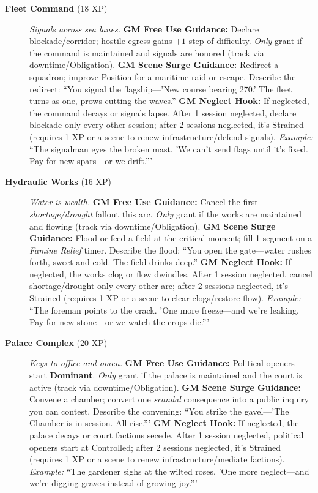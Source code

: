 \begin{description}
  \item[\textbf{Fleet Command} (18 XP)]   
        \emph{Signals across sea lanes.}  
        \textbf{GM Free Use Guidance:} Declare blockade/corridor; hostile egress gains $+1$ step of difficulty. \emph{Only} grant if the command is maintained and signals are honored (track via downtime/Obligation).  
        \textbf{GM Scene Surge Guidance:} Redirect a squadron; improve Position for a maritime raid or escape. Describe the redirect: ``You signal the flagship---'New course bearing 270.' The fleet turns as one, prows cutting the waves.''  
        \textbf{GM Neglect Hook:} If neglected, the command decays or signals lapse. After 1 session neglected, declare blockade only every other session; after 2 sessions neglected, it's Strained (requires 1 XP or a scene to renew infrastructure/defend signals).  
        \textit{Example:} ``The signalman eyes the broken mast. 'We can't send flags until it's fixed. Pay for new spars---or we drift.'''  

  \item[\textbf{Hydraulic Works} (16 XP)]   
        \emph{Water is wealth.}  
        \textbf{GM Free Use Guidance:} Cancel the first \emph{shortage/drought} fallout this arc. \emph{Only} grant if the works are maintained and flowing (track via downtime/Obligation).  
        \textbf{GM Scene Surge Guidance:} Flood or feed a field at the critical moment; fill 1 segment on a \emph{Famine Relief} timer. Describe the flood: ``You open the gate---water rushes forth, sweet and cold. The field drinks deep.''  
        \textbf{GM Neglect Hook:} If neglected, the works clog or flow dwindles. After 1 session neglected, cancel shortage/drought only every other arc; after 2 sessions neglected, it's Strained (requires 1 XP or a scene to clear clogs/restore flow).  
        \textit{Example:} ``The foreman points to the crack. 'One more freeze---and we're leaking. Pay for new stone---or we watch the crops die.'''  

  \item[\textbf{Palace Complex} (20 XP)]   
        \emph{Keys to office and omen.}  
        \textbf{GM Free Use Guidance:} Political openers start \textbf{Dominant}. \emph{Only} grant if the palace is maintained and the court is active (track via downtime/Obligation).  
        \textbf{GM Scene Surge Guidance:} Convene a chamber; convert one \emph{scandal} consequence into a public inquiry you can contest. Describe the convening: ``You strike the gavel---'The Chamber is in session. All rise.'''  
        \textbf{GM Neglect Hook:} If neglected, the palace decays or court factions secede. After 1 session neglected, political openers start at Controlled; after 2 sessions neglected, it's Strained (requires 1 XP or a scene to renew infrastructure/mediate factions).  
        \textit{Example:} ``The gardener sighs at the wilted roses. 'One more neglect---and we're digging graves instead of growing joy.'''  
\end{description}

